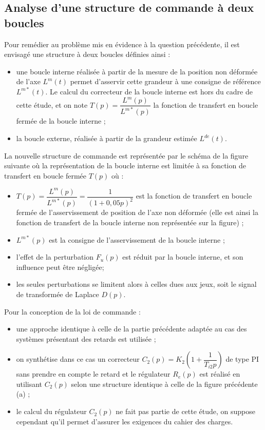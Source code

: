 \begin{multicols}{2}
\ifprof
\begin{corrige}
\end{corrige}
\else
\fi

\subsection*{Analyse d’une structure de commande à deux boucles}

Pour remédier au problème mis en évidence à la question précédente, il est envisagé une structure à deux boucles définies ainsi :
\begin{itemize}
\item une boucle interne réalisée à partir de la mesure de la position non déformée de l’axe $L^m(t)$ permet d’asservir cette grandeur à une consigne de référence $L^{m*}(t)$. Le calcul du correcteur de la boucle interne est hors du cadre de cette étude, et on note $T(p)=\dfrac{L^m(p)}{L^{m*}(p)}$ la fonction de transfert en boucle fermée de la boucle
interne ;
\item la boucle externe, réalisée à partir de la grandeur estimée $L^{de}(t)$.
\end{itemize}
La nouvelle structure de commande est représentée par le schéma de la figure suivante où la représentation de la
boucle interne est limitée à sa fonction de transfert en boucle fermée $T(p)$ où :
\begin{itemize}
\item $T(p) = \dfrac{L^m(p)}{L^{m*}(p)}= \dfrac{1}{\left(1+0,05p\right)^2}$ est la fonction de transfert en boucle fermée de l’asservissement de position de l’axe non déformée (elle est ainsi la fonction de transfert de la boucle interne non représentée sur la figure) ;
\item $L^{m*}(p)$ est la consigne de l’asservissement de la boucle interne ;
\item l’effet de la perturbation $F_u(p)$ est réduit par la boucle interne, et son influence peut être négligée;
\item les seules perturbations se limitent alors à celles dues aux jeux, soit le signal de transformée de Laplace $D(p)$.
\end{itemize}
Pour la conception de la loi de commande :
\begin{itemize}
\item une approche identique à celle de la partie précédente adaptée au cas des systèmes présentant des retards est utilisée ;
\item on synthétise dans ce cas un correcteur $C_2(p) = K_2 \left( 1+\dfrac{1}{T_{i2}p}\right) $ de type PI sans prendre en compte le retard et le régulateur $R_e(p)$ est réalisé en utilisant $C_2(p)$ selon une structure identique à celle de la figure précédente (a) ;
\item le calcul du régulateur $C_2(p)$ ne fait pas partie de cette étude, on suppose cependant qu’il permet d’assurer les exigences du cahier des charges.
\end{itemize}



\end{multicols}
